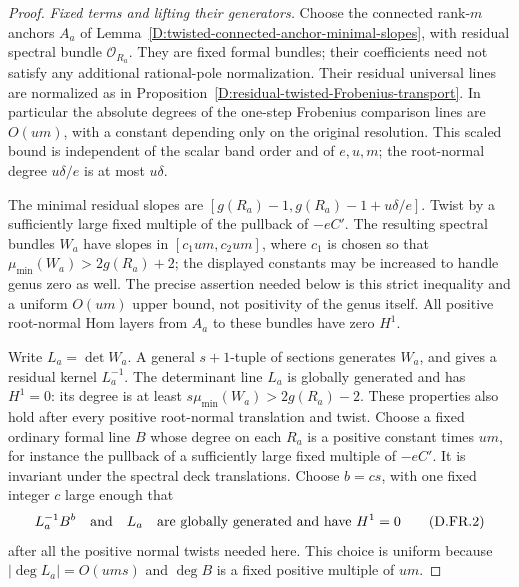 \begin{proof}
\emph{Fixed terms and lifting their generators.}
Choose the connected rank-$m$ anchors $A_a$ of
Lemma~\ref{D:twisted-connected-anchor-minimal-slopes},
with residual spectral bundle $\mathcal O_{R_a}$.
They are fixed formal bundles; their coefficients need
not satisfy any additional rational-pole normalization.
Their residual universal lines are normalized as in
Proposition~\ref{D:residual-twisted-Frobenius-transport}.
In particular the absolute degrees of the one-step Frobenius
comparison lines are $O(um)$, with a constant depending only
on the original resolution. This scaled bound is independent
of the scalar band order and of $e,u,m$; the root-normal
degree $u\delta/e$ is at most $u\delta$.

The minimal residual slopes are
$[g(R_a)-1,g(R_a)-1+u\delta/e]$. Twist by a sufficiently
large fixed multiple of the pullback of $-eC'$.
The resulting spectral bundles $W_a$ have slopes in
$[c_1um,c_2um]$, where $c_1$ is chosen so that
$\mu_{\min}(W_a)>2g(R_a)+2$; the displayed constants
may be increased to handle genus zero as well. The
precise assertion needed below is this strict inequality
and a uniform $O(um)$ upper bound, not positivity of
the genus itself. All positive root-normal Hom layers
from $A_a$ to these bundles have zero $H^1$.

Write $L_a=\det W_a$. A general $s+1$-tuple of sections
generates $W_a$, and gives a residual kernel $L_a^{-1}$.
The determinant line $L_a$ is globally generated and
has $H^1=0$: its degree is at least
$s\mu_{\min}(W_a)>2g(R_a)-2$. These properties also
hold after every positive root-normal translation and
twist. Choose a fixed ordinary formal line $B$ whose
degree on each $R_a$ is a positive constant times $um$,
for instance the pullback of a sufficiently large fixed
multiple of $-eC'$. It is invariant under the spectral
deck translations. Choose $b=c s$, with one fixed
integer $c$ large enough that
\[
       L_a^{-1}B^b\quad\hbox{and}\quad L_a
       \quad\hbox{are globally generated and have }H^1=0
                                                        \tag{D.FR.2}
\]
after all the positive normal twists needed here. This
choice is uniform because $|\deg L_a|=O(um s)$ and
$\deg B$ is a fixed positive multiple of $um$.


\end{proof}

